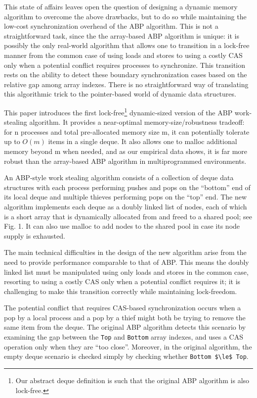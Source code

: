 This state of affairs leaves open the question of designing a
dynamic memory algorithm to overcome the above drawbacks, but to do so
while maintaining the low-cost synchronization overhead of the ABP
algorithm. This is not a straightforward task, since the the
array-based ABP algorithm is unique: it is possibly the only
real-world algorithm that allows one to transition in a lock-free
manner from the common case of using loads and stores to using a
costly CAS only when a potential conflict requires processes to
synchronize. This transition rests on the ability to detect these
boundary synchronization cases based on the relative gap among array
indexes. There is no straightforward way of translating this
algorithmic trick to the pointer-based world of dynamic data
structures.


This paper introduces the first lock-free\footnote{Our abstract deque
  definition is such that the original ABP algorithm is also
  lock-free.} dynamic-sized version of the ABP work-stealing
algorithm. It provides a near-optimal memory-size/robustness tradeoff:
for n processes and total pre-allocated memory size m, it can
potentially tolerate up to $O(m)$ items in a single deque. It also
allows one to malloc additional memory beyond m when needed, and as
our empirical data shows, it is far more robust than the array-based
ABP algorithm in multiprogrammed environments.

An ABP-style work stealing algorithm consists of a collection of deque
data structures with each process performing pushes and pops on the
``bottom'' end of its local deque and multiple thieves performing pops
on the ``top'' end. The new algorithm implements each deque as a
doubly linked list of nodes, each of which is a short array that is
dynamically allocated from and freed to a shared pool; see Fig. 1. It
can also use malloc to add nodes to the shared pool in case its node
supply is exhausted.

The main technical difficulties in the design of the new algorithm
arise from the need to provide performance comparable to that of
ABP. This means the doubly linked list must be manipulated using only
loads and stores in the common case, resorting to using a costly CAS
only when a potential conflict requires it; it is challenging to make
this transition correctly while maintaining lock-freedom.

The potential conflict that requires CAS-based synchronization occurs
when a pop by a local process and a pop by a thief might both be
trying to remove the same item from the deque. The original ABP
algorithm detects this scenario by examining the gap between the
\lstinline!Top! and \lstinline!Bottom! array indexes, and uses a CAS
operation only when they are ``too close''. Moreover, in the original
algorithm, the empty deque scenario is checked simply by checking
whether \lstinline!Bottom $\le$ Top!.


